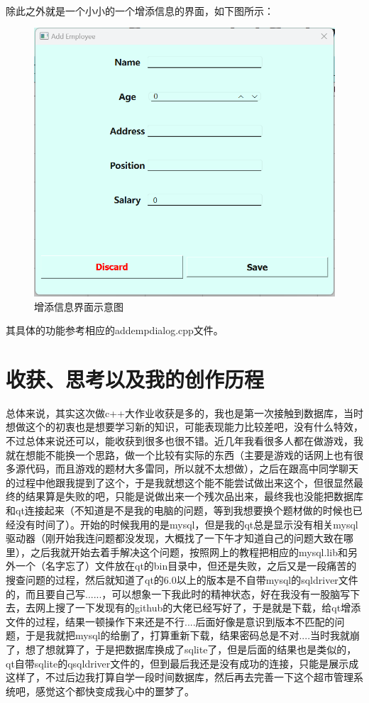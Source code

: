 \documentclass{article}
\begin{document}
\\
除此之外就是一个小小的一个增添信息的界面，如下图所示：
\begin{figure}[H]
        \centering
        \includegraphics[scale=0.6]{输入界面.png}
        \caption{增添信息界面示意图}
        \label{fig:enter-label}
\end{figure}
其具体的功能参考相应的addempdialog.cpp文件。



\section{收获、思考以及我的创作历程}
总体来说，其实这次做c++大作业收获是多的，我也是第一次接触到数据库，当时想做这个的初衷也是想要学习新的知识，可能表现能力比较差吧，没有什么特效，不过总体来说还可以，能收获到很多也很不错。近几年我看很多人都在做游戏，我就在想能不能换一个思路，做一个比较有实际的东西（主要是游戏的话网上也有很多源代码，而且游戏的题材大多雷同，所以就不太想做），之后在跟高中同学聊天的过程中他跟我提到了这个，于是我就想这个能不能尝试做出来这个，但很显然最终的结果算是失败的吧，只能是说做出来一个残次品出来，最终我也没能把数据库和qt连接起来（不知道是不是我的电脑的问题，等到我想要换个题材做的时候也已经没有时间了）。开始的时候我用的是mysql，但是我的qt总是显示没有相关mysql驱动器（刚开始我连问题都没发现，大概找了一下午才知道自己的问题大致在哪里），之后我就开始去着手解决这个问题，按照网上的教程把相应的mysql.lib和另外一个（名字忘了）文件放在qt的bin目录中，但还是失败，之后又是一段痛苦的搜查问题的过程，然后就知道了qt的6.0以上的版本是不自带mysql的sqldriver文件的，而且要自己写......，可以想象一下我此时的精神状态，好在我没有一股脑写下去，去网上搜了一下发现有的github的大佬已经写好了，于是就是下载，给qt增添文件的过程，结果一顿操作下来还是不行....后面好像是意识到版本不匹配的问题，于是我就把mysql的给删了，打算重新下载，结果密码总是不对....当时我就崩了，想了想就算了，于是把数据库换成了sqlite了，但是后面的结果也是类似的，qt自带sqlite的qsqldriver文件的，但到最后我还是没有成功的连接，只能是展示成这样了，不过后边我打算自学一段时间数据库，然后再去完善一下这个超市管理系统吧，感觉这个都快变成我心中的噩梦了。
\end{document}
